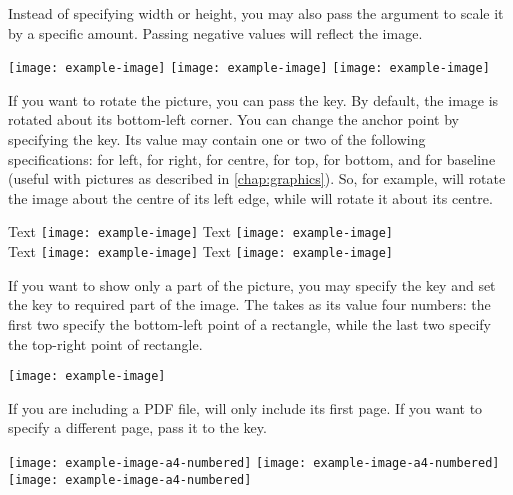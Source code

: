 Instead of specifying width or height, you may also pass the 
argument to scale it by a specific amount. Passing negative values will
reflect the image.
\begin{example}[examplewidth=0.6\linewidth]
\texttt{[image: example-image]}
\texttt{[image: example-image]}
\texttt{[image: example-image]}
\vspace{1.3cm}
\end{example}

If you want to rotate the picture, you can pass the  key. By
default, the image is rotated about its bottom-left corner. You can change the
anchor point by specifying the  key. Its value may contain one or
two of the following specifications:  for left,  for right,
 for centre,  for top,  for bottom, and  for
baseline (useful with \TikZ{} pictures as described in
\autoref{chap:graphics}). So, for example,  will rotate the image
about the centre of its left edge, while  will rotate it about its
centre.
\begin{example}
Text \texttt{[image: example-image]}
Text \texttt{[image: example-image]}  \\
Text \texttt{[image: example-image]}
Text \texttt{[image: example-image]}
\end{example}

If you want to show only a part of the picture, you may specify the
 key and set the  key to required part of the
image. The  takes as its value four numbers: the first two
specify the bottom-left point of a rectangle, while the last two specify the
top-right point of rectangle.
\begin{example}
\texttt{[image: example-image]}
\end{example}

If you are including a PDF file,  will only include its
first page. If you want to specify a different page, pass it to the 
key.
\begin{example}
\texttt{[image: example-image-a4-numbered]}
\texttt{[image: example-image-a4-numbered]}
\texttt{[image: example-image-a4-numbered]}
\end{example}

